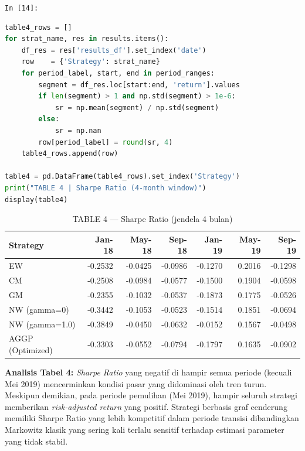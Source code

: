 \documentclass[12pt,a4paper]{article}
\newcommand{\cellIn}[1]{%
  \begin{tcolorbox}[cellheader]
    \texttt{In [#1]:}
  \end{tcolorbox}\vspace{-6pt}%
}
\begin{document}
\cellIn{14}
\begin{tcolorbox}[codebox]
\begin{lstlisting}[language=Python, numbers=none]
table4_rows = []
for strat_name, res in results.items():
    df_res = res['results_df'].set_index('date')
    row    = {'Strategy': strat_name}
    for period_label, start, end in period_ranges:
        segment = df_res.loc[start:end, 'return'].values
        if len(segment) > 1 and np.std(segment) > 1e-6:
            sr = np.mean(segment) / np.std(segment)
        else:
            sr = np.nan
        row[period_label] = round(sr, 4)
    table4_rows.append(row)

table4 = pd.DataFrame(table4_rows).set_index('Strategy')
print("TABLE 4 | Sharpe Ratio (4-month window)")
display(table4)
\end{lstlisting}
\end{tcolorbox}

\vspace{6pt}
\begin{table}[H]
  \centering
  \caption{TABLE 4 --- Sharpe Ratio (jendela 4 bulan)}
  \small
  \begin{tabular}{lrrrrrr}
    \toprule
    \textbf{Strategy} & \textbf{Jan-18} & \textbf{May-18} & \textbf{Sep-18} & \textbf{Jan-19} & \textbf{May-19} & \textbf{Sep-19} \\
    \midrule
    \midrule
    EW                        & -0.2532 & -0.0425 & -0.0986 & -0.1270 &  0.2016 & -0.1298 \\
    CM                        & -0.2508 & -0.0984 & -0.0577 & -0.1500 &  0.1904 & -0.0598 \\
    GM                        & -0.2355 & -0.1032 & -0.0537 & -0.1873 &  0.1775 & -0.0526 \\
    NW (gamma=0)              & -0.3442 & -0.1053 & -0.0523 & -0.1514 &  0.1851 & -0.0694 \\
    NW (gamma=1.0)            & -0.3849 & -0.0450 & -0.0632 & -0.0152 &  0.1567 & -0.0498 \\
    AGGP (Optimized)          & -0.3303 & -0.0552 & -0.0794 & -0.1797 &  0.1635 & -0.0902 \\
    \bottomrule
  \end{tabular}
\end{table}

\textbf{Analisis Tabel 4:} \textit{Sharpe Ratio} yang negatif di hampir semua periode (kecuali Mei 2019) mencerminkan kondisi pasar yang didominasi oleh tren turun. Meskipun demikian, pada periode pemulihan (Mei 2019), hampir seluruh strategi memberikan \textit{risk-adjusted return} yang positif. Strategi berbasis graf cenderung memiliki Sharpe Ratio yang lebih kompetitif dalam periode transisi dibandingkan Markowitz klasik yang sering kali terlalu sensitif terhadap estimasi parameter yang tidak stabil.
\end{document}
